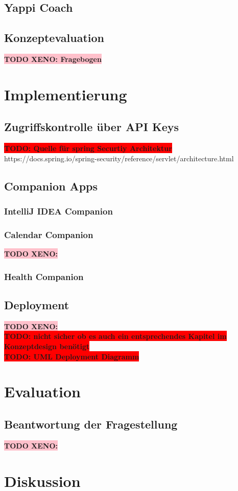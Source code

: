 \documentclass[12pt,a4paper]{report}
\newcommand{\todo}[1]{\colorbox{red}{\textbf{TODO: #1}}\\}
\newcommand{\xeno}[1]{\colorbox{pink}{\textbf{TODO XENO: #1}}\\}
\begin{document}
\section{Yappi Coach}
\section{Konzeptevaluation}
\xeno{Fragebogen}

\chapter{Implementierung}
\section{Zugriffskontrolle über API Keys}

\todo{Quelle für spring Securtiy Architektur}
https://docs.spring.io/spring-security/reference/servlet/architecture.html

\section{Companion Apps}
\subsection{IntelliJ IDEA Companion}
\subsection{Calendar Companion}
\xeno{}
\subsection{Health Companion}
\section{Deployment}
\xeno{}
\todo{nicht sicher ob es auch ein entsprechendes Kapitel im Konzeptdesign benötigt}
\todo{UML Deployment Diagramm}

\chapter{Evaluation}
\section{Beantwortung der Fragestellung}
\xeno{}

\chapter{Diskussion}

\printbibliography
\end{document}
